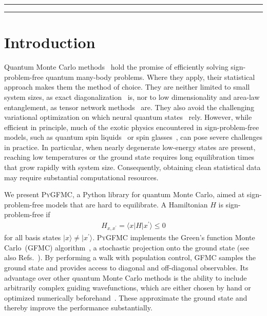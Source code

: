 \documentclass{SciPost}
\providecommand{\PyGFMC}{\textsc{PyGFMC}}
\begin{document}

\vspace{10pt}
\noindent\rule{\textwidth}{1pt}
\tableofcontents
\noindent\rule{\textwidth}{1pt}
\vspace{10pt}


\section{Introduction}\label{sec:intro}

Quantum Monte Carlo methods~\cite{becca_quantum_2017,sandvik_quantum_1991} hold the promise of efficiently solving sign-problem-free quantum many-body problems.
%
Where they apply, their statistical approach makes them the method of choice.
%
They are neither limited to small system sizes, as exact diagonalization~\cite{weinberg_quspin_2017,weinberg_quspin_2019,schaefer_danceQ_2025,DanceQ_code,wietek_xdiag_2026} is, nor to low dimensionality and area-law entanglement, as tensor network methods~\cite{white_density_1992,schollwoeck_density-matrix_2011,tenpy2024} are.
%
They also avoid the challenging variational optimization on which neural quantum states~\cite{torlai_learning_2016,carleo_solving_2017,nomura_restricted_2017} rely.
%
However, while efficient in principle, much of the exotic physics encountered in sign-problem-free models, such as quantum spin liquids~\cite{isakov_spin-liquid_2006,isakov_hard-core_2006,banerjee_unusual_2008,isakov_topological_2011,isakov_universal_2012,kato_numerical_2015,huang_extended_2020,niggemann_gapless_2026} or spin glasses~\cite{rieger_zero-temperature_1994,guo_quantum_1994,rieger_griffiths_1996,guo_quantum_1996,king_quantum_2023,bernaschi_the_2024}, can pose severe challenges in practice.
%
In particular, when nearly degenerate low-energy states are present, reaching low temperatures or the ground state requires long equilibration times that grow rapidly with system size.
%
Consequently, obtaining clean statistical data may require substantial computational resources.


We present \PyGFMC{}, a Python library for quantum Monte Carlo, aimed at sign-problem-free models that are hard to equilibrate.
%
A Hamiltonian $H$ is sign-problem-free if
\begin{align}
	H_{x,x^\prime} = \langle x\vert H\vert x^\prime\rangle \leq 0
\end{align}
for all basis states $\vert x\rangle \neq \vert x^\prime\rangle$.
%
\PyGFMC{} implements the Green's function Monte Carlo~(GFMC) algorithm~\cite{trivedi_ground-state_1990,calandra_numerical_1998,foulkes_quantum_2001}, a stochastic projection onto the ground state (see also Refs.~\cite{booth_fermion_2009,cufar_rimu_2026}).
%
By performing a walk with population control, GFMC samples the ground state and provides access to diagonal and off-diagonal observables.
%
Its advantage over other quantum Monte Carlo methods is the ability to include arbitrarily complex guiding wavefunctions, which are either chosen by hand or optimized numerically beforehand~\cite{qin_combination_2020,lin_greens_2022,lin_greens_2024}.
%
These approximate the ground state and thereby improve the performance substantially.
\end{document}
